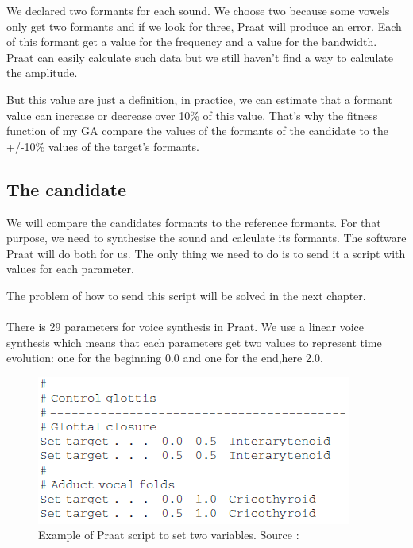 \documentclass[12pt]{report}
\begin{document}
We declared two formants for each sound. We choose two because some vowels only get two formants and if we look for three, Praat will produce an error. Each of this formant get a value for the frequency and a value for the bandwidth. Praat can easily calculate such data but we still haven't find a way to calculate the amplitude.

But this value are just a definition, in practice, we can estimate that a formant value can increase or decrease over 10\% of this value. That's why the fitness function of my GA compare the values of the formants of the candidate to the +/-10\% values of the target's formants.

\subsection{The candidate}
We will compare the candidates formants to the reference formants. For that purpose, we need to synthesise the sound and calculate its formants. The software Praat will do both for us. The only thing we need to do is to send it a script with values for each parameter.

The problem of how to send this script will be solved in the next chapter.

\paragraph*{}
There is 29 parameters for voice synthesis in Praat. We use a linear voice synthesis which means that each parameters get two values to represent time evolution: one for the beginning 0.0 and one for the end,here 2.0.

\begin{figure}[h]
\begin{center}
\includegraphics{resources/praatScript.png} 
\end{center}
\caption{Example of Praat script to set two variables. Source : \cite{ref5}}
\label{praatScript}
\end{figure}
\end{document}
